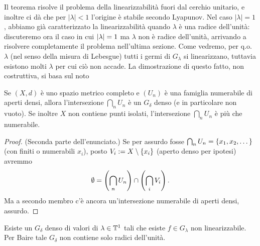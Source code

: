 Il teorema risolve il problema della linearizzabilità fuori dal cerchio unitario, e inoltre ci dà che per $|\lambda|<1$ l'origine è stabile secondo Lyapunov. Nel caso $|\lambda|=1$,
abbiamo già caratterizzato la linearizzabilità quando $\lambda$ è una radice dell'unità: discuteremo ora il caso in cui $\left|\lambda\right|=1$ ma $\lambda$ non è radice dell'unità, arrivando a risolvere completamente il problema nell'ultima sezione. Come vedremo, per q.o. $\lambda$ (nel senso della misura di Lebesgue) tutti i germi di $G_\lambda$ si linearizzano, tuttavia esistono molti $\lambda$ per cui ciò non accade. La dimostrazione di questo fatto, non costruttiva, si basa sul noto

\begin{teo}Se $(X,d)$ è uno spazio metrico completo e $(U_n)$ è una famiglia numerabile di aperti densi,
allora l'intersezione $\bigcap_n U_n$ è un $G_\delta$ denso (e in particolare non vuoto). Se inoltre $X$ non contiene punti isolati, l'intersezione $\bigcap_n U_n$ è più che numerabile.
\end{teo}

\begin{proof} (Seconda parte dell'enunciato.) Se per assurdo fosse $\bigcap_n U_n=\left\{x_1,x_2,\dots\right\}$ (con finiti o numerabili $x_i$),
posto $V_i:=X\setminus\left\{x_i\right\}$ (aperto denso per ipotesi) avremmo
\[ \emptyset=\left(\bigcap_n U_n\right)\cap\left(\bigcap_i V_i\right). \]
Ma a secondo membro c'è ancora un'intersezione numerabile di aperti densi, assurdo.
\end{proof}

\begin{teo} Esiste un $G_\delta$ denso di valori di $\lambda\in\mathbb{T}^1$ tali che esiste $f\in G_\lambda$ non linearizzabile. Per Baire tale $G_\delta$ non contiene solo radici dell'unità.\end{teo}


